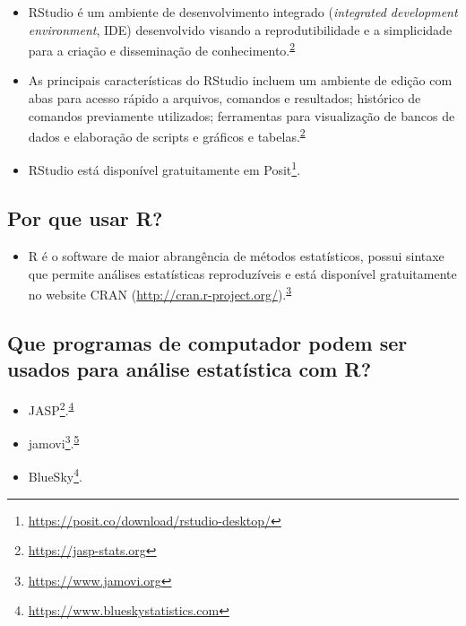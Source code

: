 \documentclass[
  a4paper,
]{book}
\providecommand{\tightlist}{%
  \setlength{\itemsep}{0pt}\setlength{\parskip}{0pt}}
\renewcommand{\href}[2]{#2\footnote{\url{#1}}}
\begin{document}
\begin{itemize}
\item
  RStudio é um ambiente de desenvolvimento integrado (\emph{integrated development environment}, IDE) desenvolvido visando a reprodutibilidade e a simplicidade para a criação e disseminação de conhecimento.\textsuperscript{\protect\hyperlink{ref-racine2011}{2}}
\item
  As principais características do RStudio incluem um ambiente de edição com abas para acesso rápido a arquivos, comandos e resultados; histórico de comandos previamente utilizados; ferramentas para visualização de bancos de dados e elaboração de scripts e gráficos e tabelas.\textsuperscript{\protect\hyperlink{ref-racine2011}{2}}
\item
  RStudio está disponível gratuitamente em \href{https://posit.co/download/rstudio-desktop/}{Posit}.
\end{itemize}

\hypertarget{por-que-usar-r}{%
\subsection{Por que usar R?}\label{por-que-usar-r}}

\begin{itemize}
\tightlist
\item
  R é o software de maior abrangência de métodos estatísticos, possui sintaxe que permite análises estatísticas reproduzíveis e está disponível gratuitamente no website CRAN (\url{http://cran.r-project.org/}).\textsuperscript{\protect\hyperlink{ref-mair2016}{3}}
\end{itemize}

\hypertarget{que-programas-de-computador-podem-ser-usados-para-anuxe1lise-estatuxedstica-com-r}{%
\subsection{Que programas de computador podem ser usados para análise estatística com R?}\label{que-programas-de-computador-podem-ser-usados-para-anuxe1lise-estatuxedstica-com-r}}

\begin{itemize}
\item
  \href{https://jasp-stats.org}{JASP}.\textsuperscript{\protect\hyperlink{ref-love2019}{4}}
\item
  \href{https://www.jamovi.org}{jamovi}.\textsuperscript{\protect\hyperlink{ref-sahin2020}{5}}
\item
  \href{https://www.blueskystatistics.com}{BlueSky}.
\end{itemize}
\end{document}

